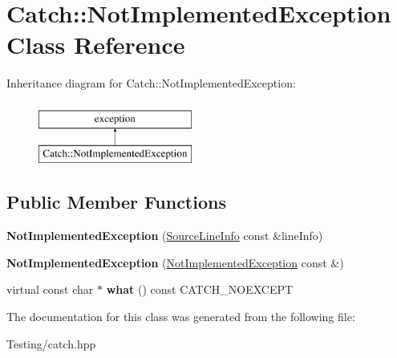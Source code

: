 \hypertarget{class_catch_1_1_not_implemented_exception}{\section{Catch\-:\-:Not\-Implemented\-Exception Class Reference}
\label{class_catch_1_1_not_implemented_exception}
}
Inheritance diagram for Catch\-:\-:Not\-Implemented\-Exception\-:\begin{figure}[H]
\begin{center}
\leavevmode
\includegraphics[height=2.000000cm]{class_catch_1_1_not_implemented_exception}
\end{center}
\end{figure}
\subsection*{Public Member Functions}
\begin{DoxyCompactItemize}
\item 
\hypertarget{class_catch_1_1_not_implemented_exception_ab4f0a5c39d8ffb72c664e2c07e180634}{{\bfseries Not\-Implemented\-Exception} (\hyperlink{struct_catch_1_1_source_line_info}{Source\-Line\-Info} const \&line\-Info)}\label{class_catch_1_1_not_implemented_exception_ab4f0a5c39d8ffb72c664e2c07e180634}

\item 
\hypertarget{class_catch_1_1_not_implemented_exception_a508a7a833455da2d3c10ea1a9d45e982}{{\bfseries Not\-Implemented\-Exception} (\hyperlink{class_catch_1_1_not_implemented_exception}{Not\-Implemented\-Exception} const \&)}\label{class_catch_1_1_not_implemented_exception_a508a7a833455da2d3c10ea1a9d45e982}

\item 
\hypertarget{class_catch_1_1_not_implemented_exception_ad4c13963f1a8feacda0cd331adda89e3}{virtual const char $\ast$ {\bfseries what} () const C\-A\-T\-C\-H\-\_\-\-N\-O\-E\-X\-C\-E\-P\-T}\label{class_catch_1_1_not_implemented_exception_ad4c13963f1a8feacda0cd331adda89e3}

\end{DoxyCompactItemize}


The documentation for this class was generated from the following file\-:\begin{DoxyCompactItemize}
\item 
Testing/catch.\-hpp\end{DoxyCompactItemize}
